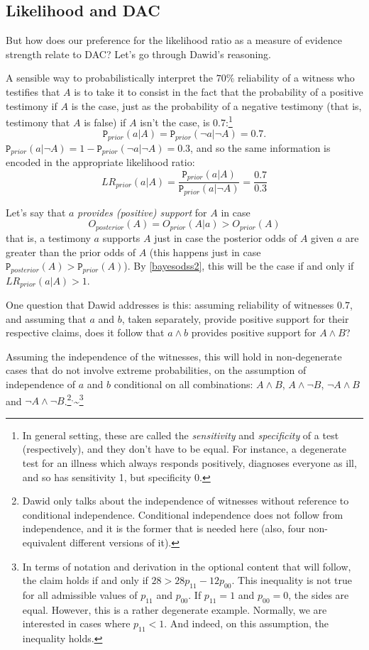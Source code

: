 \documentclass[
  10pt,
  dvipsnames,enabledeprecatedfontcommands]{scrartcl}
\newcommand{\n}{\neg}
\newcommand{\et}{\wedge}
\newcommand{\prr}[1]{\mbox{$\mathtt{P}_{prior}(#1)$}}
\newcommand{\prp}[1]{\mbox{$\mathtt{P}_{posterior}(#1)$}}
\begin{document}
\hypertarget{likelihood-and-dac}{%
\subsection{Likelihood and DAC}\label{likelihood-and-dac}}

But how does our preference for the likelihood ratio as a measure of
evidence strength relate to DAC? Let's go through Dawid's reasoning.

A sensible way to probabilistically interpret the \(70\%\) reliability
of a witness who testifies that \(A\) is to take it to consist in the
fact that the probability of a positive testimony if \(A\) is the case,
just as the probability of a negative testimony (that is, testimony that
\(A\) is false) if \(A\) isn't the case, is
0.7:\footnote{In general setting, these are called the \emph{sensitivity} and \emph{specificity} of a test (respectively), and they don't have to be equal. For instance, a degenerate test for an illness which always responds positively, diagnoses everyone as ill, and so has sensitivity 1, but specificity 0.}
\[\prr{a\vert A}=\prr{\n a\vert\n  A}=0.7.\]
\noindent   \(\prr{a\vert \n A}=1- \prr{\n a\vert \n A}=0.3\), and so
the same information is encoded in the appropriate likelihood ratio:
\[LR_{prior}(a\vert A )=\frac{\prr{a\vert A}}{\prr{a\vert \n A}}= \frac{0.7}{0.3}\]

Let's say that \(a\) \emph{provides (positive) support} for \(A\) in
case \[O_{posterior}(A)=O_{prior}(A\vert a)> O_{prior}(A)\]
\noindent  that is, a testimony \(a\) supports \(A\) just in case the
posterior odds of \(A\) given \(a\) are greater than the prior odds of
\(A\) (this happens just in case \(\prp{A}>\prr{A}\)). By
\eqref{bayesodss2}, this will be the case if and only if
\(LR_{prior}(a\vert A)>1\).

One question that Dawid addresses is this: assuming reliability of
witnesses \(0.7\), and assuming that \(a\) and \(b\), taken separately,
provide positive support for their respective claims, does it follow
that \(a \et b\) provides positive support for \(A\et B\)?

Assuming the independence of the witnesses, this will hold in
non-degenerate cases that do not involve extreme probabilities, on the
assumption of independence of \(a\) and \(b\) conditional on all
combinations: \(A\et B\), \(A\et \n B\), \(\n A \et B\) and
\(\n A \et \n B\).\footnote{Dawid only talks about the independence of witnesses without reference to  conditional independence. Conditional independence does not follow from independence, and it is the former that is needed here (also, four non-equivalent different versions of it).}\(^,\)\textasciitilde{}\footnote{In terms of notation and derivation in the optional content that will follow, the claim holds  if and only if $28 > 28 p_{11}-12p_{00}$.  This inequality is not  true for all admissible values of $p_{11}$ and $p_{00}$. If $p_{11}=1$ and $p_{00}=0$, the sides are equal. However, this is a rather degenerate example. Normally, we are  interested in cases where $p_{11}< 1$. And indeed, on this assumption, the inequality holds.}
\end{document}
